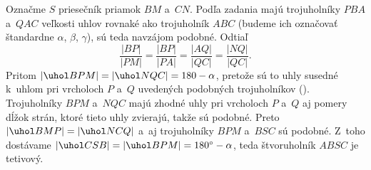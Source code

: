 {%
Označme $S$ priesečník priamok $BM$ a~$CN$. Podľa zadania majú trojuholníky $PBA$ a~$QAC$ veľkosti uhlov rovnaké ako trojuholník $ABC$ (budeme ich označovať štandardne $\alpha$, $\beta$, $\gamma$), sú teda navzájom podobné. Odtiaľ
$$
\frac{|BP|}{|PM|}=\frac{|BP|}{|PA|}=\frac{|AQ|}{|QC|}=\frac{|NQ|}{|QC|}.
$$
Pritom $|\uhol BPM|=|\uhol NQC|=180-\alpha$, pretože sú to uhly susedné k~uhlom pri vrcholoch $P$ a~$Q$ uvedených podobných trojuholníkov (\obr). Trojuholníky $BPM$ a~$NQC$ majú zhodné uhly pri vrcholoch $P$ a~$Q$ aj pomery dĺžok strán, ktoré tieto uhly zvierajú, takže sú podobné. Preto $|\uhol BMP|=|\uhol NCQ|$ a~aj trojuholníky $BPM$ a~$BSC$ sú podobné. Z~toho dostávame $|\uhol CSB|=|\uhol BPM|=180^\circ-\alpha$, teda štvoruholník $ABSC$ je tetivový.
%
%
}

